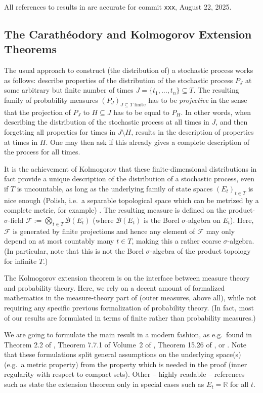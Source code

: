 \documentclass[lean]{Draft}
\begin{document}
All references to results in \mathlib are accurate for commit {\tt xxx}, August 22, 2025.

\subsection{The Carathéodory and Kolmogorov Extension Theorems}
The usual approach to construct (the distribution of) a stochastic process works as follows: describe properties of the distribution of the stochastic process $P_J$ at some arbitrary but finite number of times $J = \{t_1,...,t_n\} \subseteq T$.
The resulting family of probability measures $(P_J)_{J \subseteq T \text{ finite}}$ has to be {\em projective} in the sense that the projection of $P_J$ to $H\subseteq J$ has to be equal to $P_H$. In other words, when describing the distribution of the stochastic process at all times in $J$, and then forgetting all properties for times in $J\setminus H$, results in the description of properties at times in $H$. One may then ask if this already gives a complete description of the process for all times.

It is the achievement of Kolmogorov that these finite-dimensional distributions in fact provide a unique description of the distribution of a stochastic process, even if $T$ is uncountable, as long as the underlying family of state spaces $(E_t)_{t\in T}$ is nice enough (Polish, i.e.\ a separable topological space which can be metrized by a complete metric, for example) \cite{kolmogoroff1933grundbegriffe}.
The resulting measure is defined on the product-$\sigma$-field $\mathcal F :=\bigotimes_{t\in T} \mathcal B(E_t)$ (where $\mathcal B(E_t)$ is the Borel $\sigma$-algebra on $E_t$). Here, $\mathcal F$ is generated by finite projections and hence any element of $\mathcal F$ may only depend on at most countably many $t\in T$, making this a rather coarse $\sigma$-algebra. (In particular, note that this is not the Borel $\sigma$-algebra of the product topology for infinite $T$.)

The Kolmogorov extension theorem is on the interface between measure theory and probability theory. Here, we rely on a decent amount of formalized mathematics in the measure-theory part of \mathlib (outer measures, above all), while not requiring any specific previous formalization of probability theory. (In fact, most of our results are formulated in terms of finite rather than probability measures.)

We are going to formulate the main result in a modern fashion, as e.g.\ found in Theorem 2.2 of \cite{rao1971projective}, Theorem 7.7.1 of Volume~2 of \cite{bogachev2007measure}, Theorem 15.26 of \cite{guide2006infinite}, or \cite{border1998expository}. Note that these formulations split general assumptions on the underlying space(s) (e.g.\ a metric property) from the property which is needed in the proof (inner regularity with respect to compact sets). Other -- highly readable -- references such as \cite{Billingsley1995} state the extension theorem only in special cases such as $E_t = \mathbb R$ for all $t$.
\end{document}
